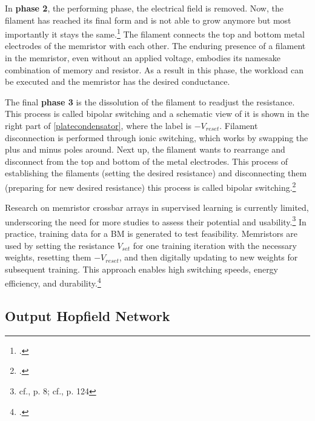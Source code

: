 In \textbf{phase 2}, the performing phase, the electrical field is removed.
Now, the filament has reached its final form and is not able to grow anymore but most importantly it stays the same.\footcite[cf.][1-2]{sungPerspectiveReviewMemristive2018}
The filament connects the top and bottom metal electrodes of the memristor with each other.
The enduring presence of a filament in the memristor, even without an applied voltage, embodies its namesake combination of memory and resistor.
As a result in this phase, the workload can be executed and the memristor has the desired conductance.

The final \textbf{phase 3} is the dissolution of the filament to readjust the resistance.
This process is called bipolar switching and a schematic view of it is shown in the right part of \ref{platecondensator}, where the label is \(-V_{reset}\).
Filament disconnection is performed through ionic switching, which works by swapping the plus and minus poles around.
Next up, the filament wants to rearrange and disconnect from the top and bottom of the metal electrodes. 
This process of establishing the filaments (setting the desired resistance) and disconnecting them (preparing for new desired resistance) this process is called bipolar switching.\footcite[cf.][7]{sungPerspectiveReviewMemristive2018}

Research on memristor crossbar arrays in supervised learning is currently limited, underscoring the need for more studies to assess their potential and usability.\footnote{cf.\cite{amirsoleimaniInMemoryVectorMatrixMultiplication2020}, p. 8; cf.\cite{sungPerspectiveReviewMemristive2018}, p. 124}
In practice, training data for a \ac{BM} is generated to test feasibility.
Memristors are used by setting the resistance \(V_{set}\) for one training iteration with the necessary weights, resetting them \(-V_{reset}\), and then digitally updating to new weights for subsequent training.
This approach enables high switching speeds, energy efficiency, and durability.\footcite[cf.][3]{amirsoleimaniInMemoryVectorMatrixMultiplication2020}

\subsection{Output Hopfield Network}

